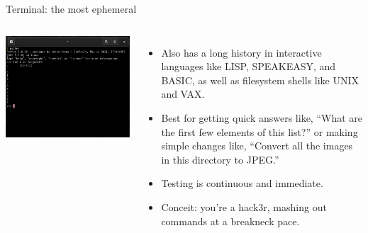 \documentclass[aspectratio=169]{beamer}
\begin{document}
\begin{frame}{Terminal: the most ephemeral}
\vspace{0.2 cm}
\begin{columns}
\includegraphics[width=\linewidth]{../img/fundamental-3-modes-terminal.png}

\large
\begin{itemize}\setlength{\itemsep}{0.25 cm}
\item<1-> Also has a long history in interactive languages like LISP, SPEAKEASY, and BASIC, as well as filesystem shells like UNIX and VAX.
\item<2-> Best for getting quick answers like, ``What are the first few elements of this list?'' or making simple changes like, ``Convert all the images in this directory to JPEG.''
\item<3-> Testing is continuous and immediate.
\item<4-> Conceit: you're a hack3r, mashing out commands at a breakneck pace.
\end{itemize}
\end{columns}
\end{frame}
\end{document}
